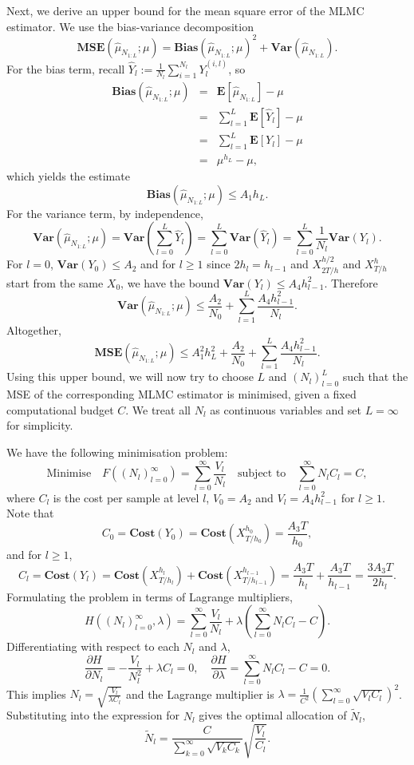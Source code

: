 \documentclass{article}
\begin{document}
Next, we derive an upper bound for the mean square error of the MLMC estimator. We use the bias-variance decomposition
\[ \mathbf{MSE}(\hat\mu_{N_{1:L}}; \mu) = \mathbf{Bias}(\hat\mu_{N_{1:L}}; \mu)^2 + \mathbf{Var}(\hat\mu_{N_{1:L}}). \]
For the bias term, recall \(\hat Y_l := \frac{1}{N_l}\sum_{i=1}^{N_l} Y_l^{(i,l)}\), so
\begin{eqnarray*} 
    \mathbf{Bias}(\hat\mu_{N_{1:L}}; \mu) & = & \mathbf{E}[\hat\mu_{N_{1:L}}] - \mu \\
                                          & = & \sum_{l=1}^L\mathbf{E}[\hat Y_l] - \mu \\
                                          & = & \sum_{l=1}^L\mathbf{E}[Y_l] - \mu \\
                                          & = & \mu^{h_L} - \mu,
\end{eqnarray*}
which yields the estimate 
\[\mathbf{Bias}(\hat\mu_{N_{1:L}}; \mu) \leq A_1h_L. \] 
For the variance term, by independence, 
\[ \mathbf{Var}(\hat\mu_{N_{1:L}}; \mu) = \mathbf{Var}\left(\sum_{l=0}^L \hat Y_l\right) = \sum_{l=0}^L \mathbf{Var}(\hat Y_l) = \sum_{l=0}^L\frac{1}{N_l}\mathbf{Var}(Y_l). \]
For \(l = 0\), \(\mathbf{Var}(Y_0) \leq A_2\) and for \(l \geq 1\) since \(2h_l = h_{l-1}\) and \(X^{h/2}_{2T/h}\) and \(X^h_{T/h}\) start from the same \(X_0\), we have the bound \(\mathbf{Var}(Y_l) \leq A_4h_{l-1}^2\). Therefore
\[ \mathbf{Var}(\hat\mu_{N_{1:L}}; \mu) \leq \frac{A_2}{N_0} + \sum_{l=1}^L \frac{A_4h_{l-1}^2}{N_l}. \]
Altogether, 
\[ \mathbf{MSE}(\hat\mu_{N_{1:L}}; \mu) \leq A_1^2h_L^2 + \frac{A_2}{N_0} + \sum_{l=1}^L\frac{A_4h_{l-1}^2}{N_l}. \]
Using this upper bound, we will now try to choose \(L\) and \((N_l)_{l=0}^L\) such that the MSE of the corresponding MLMC estimator is minimised, given a fixed computational budget \(C\). We treat all \(N_l\) as continuous variables and set \(L = \infty\) for simplicity. 

We have the following minimisation problem:
\[ \mbox{Minimise} \quad F((N_l)_{l=0}^\infty) = \sum_{l=0}^\infty \frac{V_l}{N_l} \quad \mbox{subject to} \quad \sum_{l=0}^\infty N_lC_l = C, \]
where \(C_l\) is the cost per sample at level \(l\), \(V_0 = A_2\) and \(V_l = A_4h_{l-1}^2\) for \(l \geq 1\). Note that
\[ C_0 = \mathbf{Cost}(Y_0) = \mathbf{Cost}(X^{h_0}_{T/h_0}) = \frac{A_3T}{h_0},  \]
and for \(l \geq 1\),
\[ C_l = \mathbf{Cost}(Y_l) = \mathbf{Cost}(X^{h_l}_{T/h_l}) + \mathbf{Cost}(X^{h_{l-1}}_{T/h_{l-1}}) = \frac{A_3T}{h_l} + \frac{A_3T}{h_{l-1}} = \frac{3A_3T}{2h_l}.  \]
Formulating the problem in terms of Lagrange multipliers,
\[ H((N_l)_{l=0}^\infty, \lambda) = \sum_{l=0}^\infty \frac{V_l}{N_l} + \lambda\left(\sum_{l=0}^\infty N_lC_l - C\right). \]
Differentiating with respect to each \(N_l\) and \(\lambda\),
\[ \frac{\partial H}{\partial N_l} = -\frac{V_l}{N^2_l} + \lambda C_l = 0, \quad \frac{\partial H}{\partial \lambda} = \sum_{l=0}^\infty N_lC_l - C = 0. \]
This implies \(N_l = \sqrt{\frac{V_l}{\lambda C_l}}\) and the Lagrange multiplier is \(\lambda = \frac{1}{C^2}\left(\sum_{l=0}^\infty \sqrt{V_lC_l}\right)^2\). Substituting into the expression for \(N_l\) gives the optimal allocation of \(\tilde{N}_l\),
\[ \tilde{N}_l = \frac{C}{\sum_{k=0}^\infty \sqrt{V_kC_k}} \sqrt{\frac{V_l}{C_l}}. \]
\end{document}
